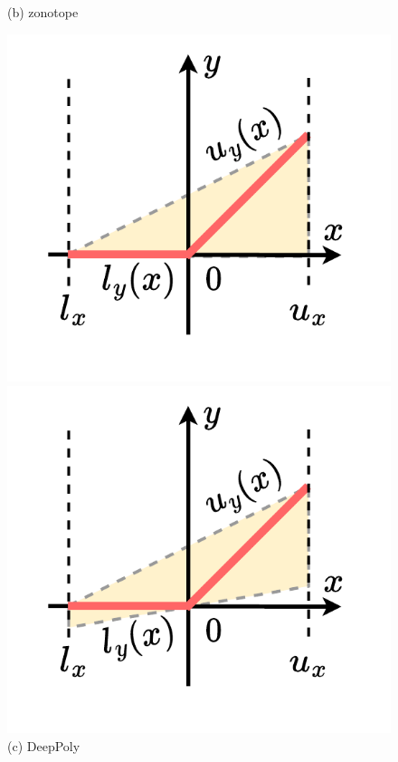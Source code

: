 \documentclass[oneside,11pt,dvipsnames]{book}
\numberwithin{equation}{section}
\theoremstyle{definition}
\theoremstyle{remark}
\begin{document}
\begin{figure}
\begin{minipage}[b]{1\linewidth}
\begin{minipage}[c]{0.24\linewidth}
            \vspace*{-10mm}
            \caption*{(b) zonotope}
        \end{minipage}
        \begin{minipage}[c]{0.24\linewidth}
            \includegraphics[width=\linewidth]{figure/polytope-3.pdf}
            \vspace*{-10mm}
            \caption*{(c) DeepPoly}
        \end{minipage}
        \begin{minipage}[c]{0.24\linewidth}
            \includegraphics[width=\linewidth]{figure/lirpa-3.pdf}

\end{minipage}
\end{minipage}
\end{figure}
\end{document}
